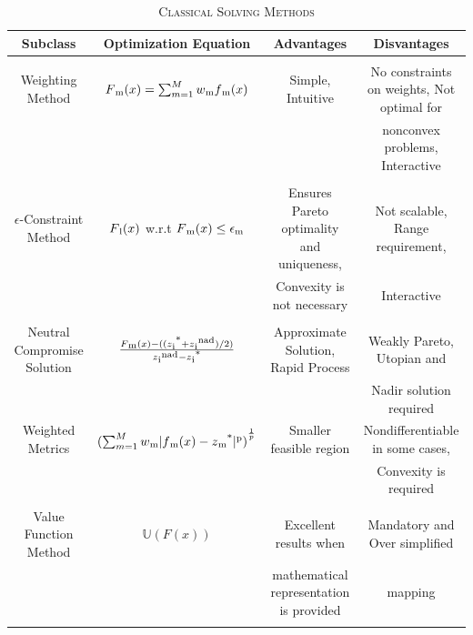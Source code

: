 \documentclass[conference]{IEEEtran}
\newcommand\sufr[3][0pt]{$\rule{0pt}{\dimexpr#1+1.4ex\relax}^\frac{#2}{#3}$}
\begin{document}
\begin{table}
\caption{\textsc{Classical Solving Methods}}
\label{tab1}
\centering
\scalebox{0.9}
{
\begin{tabular}{| c | c | c | c |}
\hline
\textbf{Subclass} & \textbf{Optimization Equation} & \textbf{Advantages} & \textbf{Disvantages}\\
\hline
 &&&\\
 Weighting Method \cite{arora} & $F\textsubscript{m}(x) =  \sum_{m=1}^{M}w\textsubscript{m}f\textsubscript{m}(x)$ & Simple, Intuitive & No constraints on weights, Not optimal for \\
 &&&nonconvex problems, Interactive\\
\hline
&&&\\
 $\epsilon$-Constraint Method \cite{cooper}& $F\textsubscript{l}(x)$ w.r.t $F\textsubscript{m}(x) \leq \epsilon\textsubscript{m}$ & Ensures Pareto optimality and uniqueness,  & Not scalable, Range requirement,\\
   &  & Convexity is not necessary & Interactive \\
 &&&\\
 \hline 
 Neutral Compromise Solution & $\frac{F\textsubscript{m}(x) - ((z\textsubscript{i}\textsuperscript{*} + z\textsubscript{i}\textsuperscript{nad})/2)}{z\textsubscript{i}\textsuperscript{nad} - z\textsubscript{i}\textsuperscript{*}}$ & Approximate Solution, Rapid Process  & Weakly Pareto, Utopian and  \\
  &  &  & Nadir solution required \\
\hline
 Weighted Metrics \cite{ryu}& $(\sum_{m=1}^{M}w\textsubscript{m}|f\textsubscript{m}(x) - z\textsubscript{m}\textsuperscript{*}|\textsuperscript{p})\textsuperscript{\sufr{1}{p}}$ & Smaller feasible region & Nondifferentiable in some cases, \\
  &  &  & Convexity is required\\
 \hline
 &&&\\
 Value Function Method \cite{sinha}& $\mathbb{U}(F(x))$ & Excellent results when & Mandatory and Over simplified\\
   &  & mathematical representation is provided & mapping\\
 &&&\\
 \hline
\end{tabular}
}
\end{table}
\end{document}
